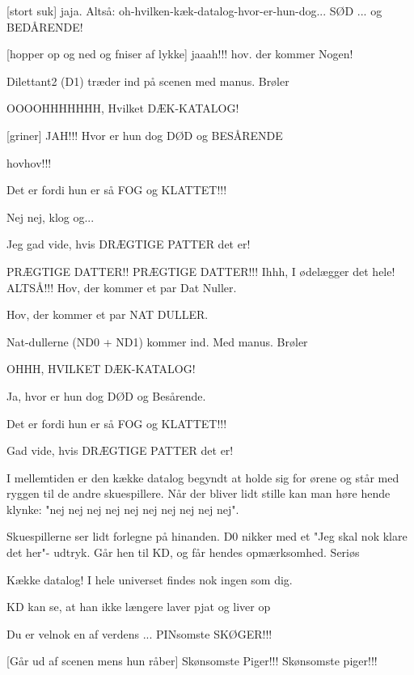 \documentclass[a4paper,11pt]{article}
\begin{document}
\begin{sketch}
  [stort suk] jaja. Altså:
  oh-hvilken-kæk-datalog-hvor-er-hun-dog... SØD ...  og BEDÅRENDE!
  
  [hopper op og ned og fniser af lykke] jaaah!!!  hov. der kommer Nogen!
  
  \scene Dilettant2 (D1) træder ind på scenen med manus. Brøler
  
   OOOOHHHHHHH, Hvilket DÆK-KATALOG!
  
  [griner] JAH!!! Hvor er hun dog DØD og BESÅRENDE
  
   hovhov!!!
  
   Det er fordi hun er så FOG og KLATTET!!!
  
   Nej nej, klog og...
  
   Jeg gad vide, hvis DRÆGTIGE PATTER det er!
  
   PRÆGTIGE DATTER!! PRÆGTIGE DATTER!!! Ihhh, I ødelægger det
  hele!  ALTSÅ!!!  Hov, der kommer et par Dat Nuller.
  
   Hov, der kommer et par NAT DULLER.
  
  \scene Nat-dullerne (ND0 + ND1) kommer ind. Med manus. Brøler
  
   OHHH, HVILKET DÆK-KATALOG!
  
   Ja, hvor er hun dog DØD og Besårende.
  
   Det er fordi hun er så FOG og KLATTET!!!
  
   Gad vide, hvis DRÆGTIGE PATTER det er!
  
  \scene I mellemtiden er den kække datalog begyndt at holde sig for
  ørene og står med ryggen til de andre skuespillere. Når der bliver
  lidt stille kan man høre hende klynke: "nej nej nej nej nej nej nej
  nej nej nej".
  
  \scene Skuespillerne ser lidt forlegne på hinanden. D0 nikker med et
  "Jeg skal nok klare det her"- udtryk. Går hen til KD, og får hendes
  opmærksomhed. Seriøs

  
   Kække datalog! I hele universet findes nok ingen som dig.
  
  \scene KD kan se, at han ikke længere laver pjat og liver op
  
   Du er velnok en af verdens ...  PINsomste
  SKØGER!!! 
  
  [Går ud af scenen mens hun råber] Skønsomste Piger!!!
  Skønsomste piger!!!
  

\end{sketch}
\end{document}
